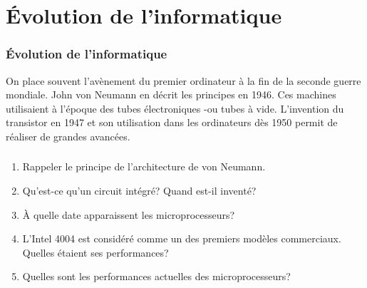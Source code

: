 \documentclass[svgnames,11pt]{beamer}
\begin{document}
\section{Évolution de l'informatique}
\begin{frame}
    \frametitle{Évolution de l'informatique}
\begin{aretenir}[Rappels]
On place souvent l'avènement du premier ordinateur à la fin de la seconde guerre mondiale. John von Neumann en décrit les principes en 1946. Ces machines utilisaient à l'époque des tubes électroniques -ou tubes à vide. L'invention du transistor en 1947 et son utilisation dans les ordinateurs dès 1950 permit de réaliser de grandes avancées.
\end{aretenir}
    

\end{frame}
\begin{frame}
    \frametitle{}

    \begin{activite}
    \begin{enumerate}
        \item Rappeler le principe de l'architecture de von Neumann.
        \item Qu'est-ce qu'un circuit intégré? Quand est-il inventé?
        \item À quelle date apparaissent les microprocesseurs?
        \item L'Intel 4004 est considéré comme un des premiers modèles commerciaux. Quelles étaient ses performances?
        \item Quelles sont les performances actuelles des microprocesseurs?
    \end{enumerate}
    \end{activite}
\end{frame}
\end{document}
